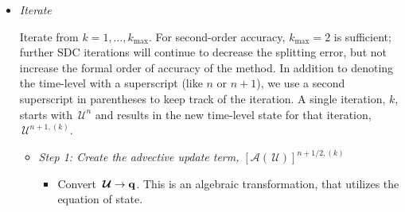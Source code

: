 \documentclass[linenumbers,trackchanges]{aastex631}
\newcommand{\Ic}{{\boldsymbol{\mathcal{I}}}}
\newcommand{\kmax}{{k_\mathrm{max}}}
\newcommand{\Uc}{{\,\bm{\mathcal{U}}}}
\newcommand{\qb}{{\bf q}}
\newcommand{\Rb}{{\bf R}}
\newcommand{\Adv}[1]{{\left [\boldsymbol{\mathcal{A}} \left(#1\right)\right]}}
\begin{document}
\begin{itemize}








\item {\em Iterate}

  Iterate from $k = 1, \ldots, \kmax$.  For second-order accuracy,
  $\kmax = 2$ is sufficient; further SDC iterations will continue to decrease the splitting error,
  but not increase the formal order of accuracy of the method.  In addition to denoting the time-level
  with a superscript (like $n$ or $n+1$), we use a second superscript
  in parentheses to keep track of the iteration.  A single iteration, $k$,
  starts with $\Uc^n$ and results in the new time-level state for that
  iteration, $\Uc^{n+1,(k)}$.

  \begin{itemize}
  \item {\em Step 1: Create the advective update term, $\Adv{\Uc}^{n+1/2,(k)}$}

    \begin{itemize}
    \item Convert $\Uc \rightarrow \qb$.  This is an algebraic transformation,
      that utilizes the equation of state.


\end{itemize}
\end{itemize}
\end{itemize}
\end{document}
